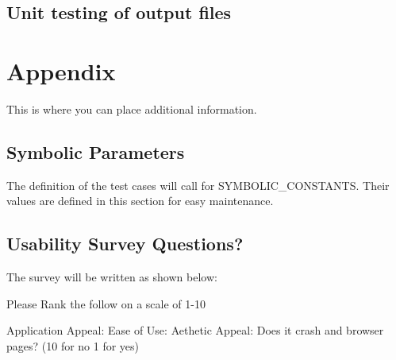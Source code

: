 \documentclass[12pt, titlepage]{article}
\begin{document}
\subsection{Unit testing of output files}		
\newpage
\section{Appendix}
This is where you can place additional information.
\subsection{Symbolic Parameters}
The definition of the test cases will call for SYMBOLIC\_CONSTANTS.
Their values are defined in this section for easy maintenance.
\subsection{Usability Survey Questions?}
The survey will be written as shown below:

Please Rank the follow on a scale of 1-10

Application Appeal:
Ease of Use:
Aethetic Appeal:
Does it crash and browser pages? (10 for no 1 for yes)
\end{document}
